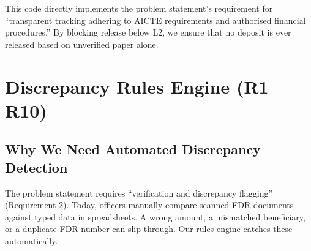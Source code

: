 \documentclass[12pt, a4paper]{report}
\begin{document}
\begin{connectionbox}
This code directly implements the problem statement's requirement for ``transparent tracking adhering to AICTE requirements and authorised financial procedures.'' By blocking release below L2, we ensure that no deposit is ever released based on unverified paper alone.
\end{connectionbox}


\chapter{Discrepancy Rules Engine (R1--R10)}

\section{Why We Need Automated Discrepancy Detection}

\begin{connectionbox}
The problem statement requires ``verification and discrepancy flagging'' (Requirement 2). Today, officers manually compare scanned FDR documents against typed data in spreadsheets. A wrong amount, a mismatched beneficiary, or a duplicate FDR number can slip through. Our rules engine catches these automatically.
\end{connectionbox}
\end{document}
